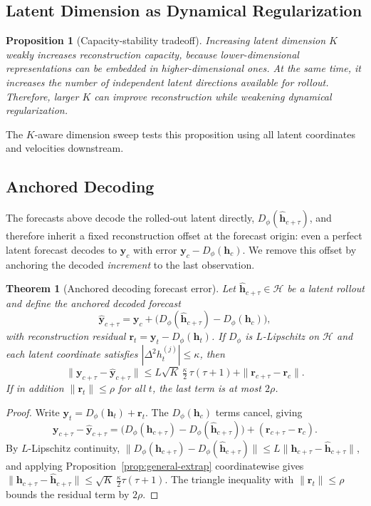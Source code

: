 \documentclass[a4paper,fleqn]{cas-sc}
\newtheorem{theorem}{Theorem}
\newtheorem{proposition}{Proposition}
\newcommand{\h}{\mathbf{h}}
\newcommand{\y}{\mathbf{y}}
\newcommand{\Hspace}{\mathcal{H}}
\begin{document}
\subsection{Latent Dimension as Dynamical Regularization}

\begin{proposition}[Capacity-stability tradeoff]
\label{prop:k-regularization}
Increasing latent dimension $K$ weakly increases reconstruction capacity,
because lower-dimensional representations can be embedded in higher-dimensional
ones. At the same time, it increases the number of independent latent
directions available for rollout. Therefore, larger $K$ can improve
reconstruction while weakening dynamical regularization.
\end{proposition}

The $K$-aware dimension sweep tests this proposition using all latent
coordinates and velocities downstream.

\subsection{Anchored Decoding}
\label{sec:anchored}

The forecasts above decode the rolled-out latent directly, $D_\phi(\hat{\h}_{c+\tau})$,
and therefore inherit a fixed reconstruction offset at the forecast origin: even
a perfect latent forecast decodes to $\y_c$ with error $\y_c-D_\phi(\h_c)$. We
remove this offset by anchoring the decoded \emph{increment} to the last
observation.

\begin{theorem}[Anchored decoding forecast error]
\label{thm:anchored}
Let $\hat{\h}_{c+\tau}\in\Hspace$ be a latent rollout and define the anchored
decoded forecast
\[
  \hat{\y}_{c+\tau} = \y_c + \big(D_\phi(\hat{\h}_{c+\tau}) - D_\phi(\h_c)\big),
\]
with reconstruction residual $\mathbf{r}_t=\y_t-D_\phi(\h_t)$. If $D_\phi$ is
$L$-Lipschitz on $\Hspace$ and each latent coordinate satisfies
$|\Delta^2 h^{(j)}_t|\le\kappa$, then
\[
  \|\y_{c+\tau}-\hat{\y}_{c+\tau}\|
  \le L\sqrt{K}\,\tfrac{\kappa}{2}\,\tau(\tau+1) + \|\mathbf{r}_{c+\tau}-\mathbf{r}_c\|.
\]
If in addition $\|\mathbf{r}_t\|\le\rho$ for all $t$, the last term is at most $2\rho$.
\end{theorem}

\begin{proof}
Write $\y_t=D_\phi(\h_t)+\mathbf{r}_t$. The $D_\phi(\h_c)$ terms cancel, giving
\[
  \y_{c+\tau}-\hat{\y}_{c+\tau}
  = \big(D_\phi(\h_{c+\tau})-D_\phi(\hat{\h}_{c+\tau})\big)
  + (\mathbf{r}_{c+\tau}-\mathbf{r}_c).
\]
By $L$-Lipschitz continuity,
$\|D_\phi(\h_{c+\tau})-D_\phi(\hat{\h}_{c+\tau})\|\le L\|\h_{c+\tau}-\hat{\h}_{c+\tau}\|$,
and applying Proposition~\ref{prop:general-extrap} coordinatewise gives
$\|\h_{c+\tau}-\hat{\h}_{c+\tau}\|\le\sqrt{K}\,\tfrac{\kappa}{2}\tau(\tau+1)$. The
triangle inequality with $\|\mathbf{r}_t\|\le\rho$ bounds the residual term by $2\rho$.
\end{proof}
\end{document}
